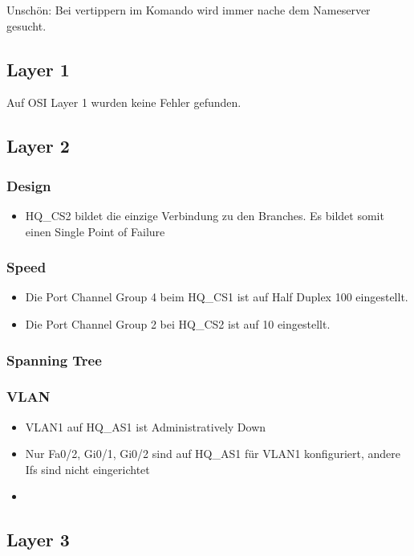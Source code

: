 Unschön: Bei vertippern im Komando wird immer nache dem Nameserver gesucht.

\subsection{Layer 1}
Auf OSI Layer 1 wurden keine Fehler gefunden.

\subsection{Layer 2}

\subsubsection{Design}
\begin{itemize}
	\item HQ\_CS2 bildet die einzige Verbindung zu den Branches. Es bildet somit einen Single Point of Failure
\end{itemize}

\subsubsection{Speed}
\begin{itemize}
	\item Die Port Channel Group 4 beim HQ\_CS1 ist auf Half Duplex 100 eingestellt.
	\item Die Port Channel Group 2 bei HQ\_CS2 ist auf 10 eingestellt. 
\end{itemize}

\subsubsection{Spanning Tree}

\subsubsection{VLAN}
\begin{itemize}
	\item VLAN1 auf HQ\_AS1 ist Administratively Down
	\item Nur Fa0/2, Gi0/1, Gi0/2 sind auf HQ\_AS1 für VLAN1 konfiguriert, andere Ifs sind nicht eingerichtet
	\item
\end{itemize}

\subsection{Layer 3}

